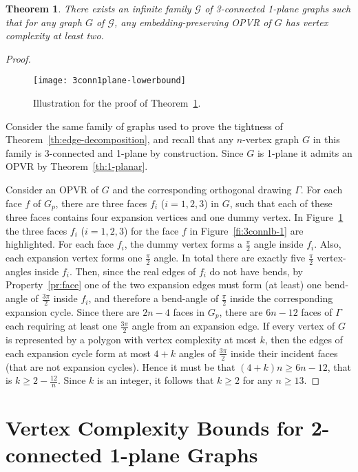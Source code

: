 \documentclass{article}
\newtheorem{theorem}{Theorem}
\newcommand{\ph}{\frac{\pi}{2}}
\newcommand{\pt}{\frac{3\pi}{2}}
\newcommand{\opvr}{OPVR\xspace}
\begin{document}
\begin{theorem}\label{th:3conn-lb}
There exists an infinite family $\mathcal G$ of 3-connected 1-plane graphs such that for any graph $G$ of $\mathcal G$, any embedding-preserving \opvr of $G$ has vertex complexity at least two.
\end{theorem}
\begin{proof}

\begin{figure}[t]
    \centering
    \texttt{[image: 3conn1plane-lowerbound]}
    \caption{ Illustration for the proof of Theorem~\ref{th:3conn-lb}.}\label{fi:3connlb-2}
\end{figure}


Consider the same family of graphs used to prove the tightness of Theorem~\ref{th:edge-decomposition}, and recall that any $n$-vertex graph $G$ in this family is 3-connected and 1-plane by construction. Since $G$ is 1-plane it admits an \opvr by Theorem~\ref{th:1-planar}.

Consider an \opvr of $G$ and the corresponding orthogonal drawing $\Gamma$. For each face $f$ of $G_p$, there are three faces $f_i$ ($i=1,2,3$) in $G$, such that each of these three faces contains four expansion vertices and one dummy vertex. In Figure~\ref{fi:3connlb-2} the three faces $f_i$ ($i=1,2,3$) for the face $f$ in Figure~\ref{fi:3connlb-1} are highlighted. For each face $f_i$, the dummy vertex forms a $\ph$ angle inside $f_i$. Also, each expansion vertex forms one $\ph$ angle. In total there are exactly five $\ph$ vertex-angles inside $f_i$.  Then, since the real edges of $f_i$ do not have bends, by Property~\ref{pr:face} one of the two expansion edges must form (at least) one bend-angle of $\pt$ inside $f_i$, and therefore a bend-angle of $\ph$ inside the corresponding expansion cycle. Since there are $2n-4$ faces in $G_p$, there are $6n-12$ faces of $\Gamma$ each requiring at least one $\pt$ angle from an expansion edge. If every vertex of $G$ is represented by a polygon with vertex complexity at most $k$, then the edges of each expansion cycle form at most $4+k$ angles of $\pt$ inside their incident faces (that are not expansion cycles). Hence it must be that $(4+k)n \geq 6n-12$, that is $k \geq 2 - \frac{12}{n}$. Since $k$ is an integer, it follows that $k \geq 2$ for any $n \geq 13$.
\end{proof}



\section{Vertex Complexity Bounds for 2-connected 1-plane Graphs}\label{se:2conn-bounds}
\end{document}
